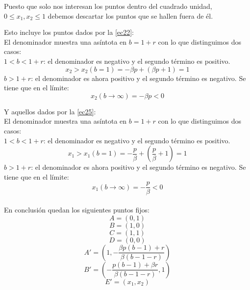 \documentclass[11pt]{article}
\begin{document}
\newpage

\noindent Puesto que solo nos interesan los puntos dentro del cuadrado unidad, $0\leq x_1,x_2\leq 1$ debemos descartar los puntos que se hallen fuera de él.

Esto incluye los puntos dados por la \autoref{ec22}:\\
El denominador muestra una asíntota en $b=1+r$ con lo que distinguimos dos casos:\\
$1<b<1+r$: el denominador es negativo y el segundo término es positivo.
\begin{equation*}
x_2>x_2(b=1)=-\beta p+(\beta p+1)=1
\end{equation*}
$b>1+r$: el denominador es ahora positivo y el segundo término es negativo. Se tiene que en el límite:
\begin{equation*}
x_2(b\rightarrow\infty)=-\beta p<0
\end{equation*}


Y aquellos dados por la \autoref{ec25}:\\
El denominador muestra una asíntota en $b=1+r$ con lo que distinguimos dos casos:\\
$1<b<1+r$: el denominador es negativo y el segundo término es positivo.
\begin{equation*}
x_1>x_1(b=1)=-\dfrac{p}{\beta}+\left(\dfrac{p}{\beta}+1\right)=1
\end{equation*}
$b>1+r$: el denominador es ahora positivo y el segundo término es negativo. Se tiene que en el límite:
\begin{equation*}
x_1(b\rightarrow\infty)=-\dfrac{p}{\beta}<0
\end{equation*}\\

En conclusión quedan los siguientes puntos fijos:
\begin{equation*}
A=(0,1)
\end{equation*}
\begin{equation*}
B=(1,0)
\end{equation*}
\begin{equation*}
C=(1,1)
\end{equation*}
\begin{equation*}
D=(0,0)
\end{equation*}
\begin{equation*}
A'=\left(1,-\dfrac{\beta p(b-1)+r}{\beta(b-1-r)}\right)
\end{equation*}
\begin{equation*}
B'=\left(-\dfrac{p(b-1)+\beta r}{\beta(b-1-r)},1\right)
\end{equation*}
\begin{equation*}
E'=\left(x_1,x_2\right)
\end{equation*}
\vspace{-1.2cm}
\end{document}
